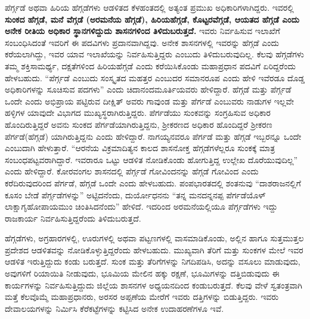 ಪೆರ್ಗ್ಗಡೆ ಅಥವಾ ಹಿರಿಯ ಹೆಗ್ಗಡೆಗಳು ಆಡಳಿತದ ಕೆಳಹಂತದಲ್ಲಿ ಅತ್ಯಂತ ಪ್ರಮುಖ ಅಧಿಕಾರಿಗಳಾಗಿದ್ದರು. ಇವರಲ್ಲಿ \textbf{ಸುಂಕದ ಹೆಗ್ಗಡೆ, ಮನೆ ವೆಗ್ಗಡೆ (ಅರಮನೆಯ ಹೆಗ್ಗಡೆ), ಹಿರಿಯಹೆಗ್ಗಡೆ, ಕೊಟ್ಟರವೆಗ್ಗಡೆ, ಆಯತದ ಹೆಗ್ಗಡೆ ಎಂದು ಅನೇಕ ರೀತಿಯ ಅಧಿಕಾರ ಸ್ಥಾನಗಳಿದ್ದುದು ಶಾಸನಗಳಿಂದ ತಿಳಿದುಬರುತ್ತದೆ. } ಇವರು ನಿರ್ವಹಿಸುವ ಇಲಾಖೆಗೆ ಸಂಬಂಧಿಸಿದಂತೆ ಇವರಿಗೆ ಈ ಪದವಿಗಳು ಪ್ರದಾನವಾಗಿದ್ದವು. ಅನೇಕ ಶಾಸನಗಳಲ್ಲಿ ಇವರನ್ನು ಹೆಗ್ಗಡೆ ಎಂದು ಕರೆಯಲಾಗಿದ್ದು, ಇವರ ಯಾವ ಇಲಾಖೆಯನ್ನು ನಿರ್ವಹಿಸುತ್ತಿದ್ದರು ಎಂಬುದು ತಿಳಿದುಬರುವುದಿಲ್ಲ. ಕೆಲವು ಹೆಗ್ಗಡೆಗಳು ತಮ್ಮ ಶಕ್ತಿಸಾಮರ್ಥ್ಯ, ದಕ್ಷತೆಗಳಿಂದ ಹಿರಿಯಹೆಗ್ಗಡೆ ಎಂದು ಕರೆಯಿಸಿಕೊಂಡು ಮಹಾಪ್ರಧಾನ ಪದವಿಗೆ ಏರಿದ್ದರೆಂದು ಹೇಳಬಹುದು. “ಪೆರ್ಗ್ಗಡೆ ಎಂಬುದು ಸಂಸ್ಕೃತದ ಮಹತ್ತರ ಎಂಬುದರ ಸಮಾನರೂಪ ಎಂದು ಹೇಳಿ ಇವೆರಡೂ ದೊಡ್ಡ ಅಧಿಕಾರಿಗಳನ್ನು ಸೂಚಿಸುವ ಪದಗಳು” ಎಂದು ಚಿದಾನಂದಮೂರ್ತಿಯವರು ಹೇಳಿದ್ದಾರೆ. ಹೆಗ್ಗಡೆ ಮತ್ತು ಪೆರ್ಗ್ಗಡೆ ಒಂದೇ ಎಂದು ಅಭಿಪ್ರಾಯ ಪಟ್ಟಿರುವ ದೀಕ್ಷಿತ್​ ಅವರು ಗಾವುಂಡ ಮತ್ತು ಪೆರ್ಗಡೆ ಎಂಬುವರು ನಾಡುಗಳ ಇಲ್ಲವೇ ಹಳ್ಳಿಗಳ ಯಾವುದೇ ವಿಭಾಗದ ಮುಖ್ಯಸ್ಥರಾಗಿರುತ್ತಿದ್ದರು. ಪೆರ್ಗಡೆಯು ಸುಂಕವನ್ನು ಸಂಗ್ರಹಿಸುವ ಅಧಿಕಾರ ಹೊಂದಿರುತ್ತಿದ್ದರೆ ಅವನು ಸುಂಕದ ಪೆರ್ಗಡೆಯಾಗಿರುತ್ತಿದ್ದನು, ಶ‍್ರೀಕರಣದ ಅಧಿಕಾರ ಹೊಂದಿದ್ದರೆ ಶ‍್ರೀಕರಣ ಪೆರ್ಗಡೆ(ಹೆಗ್ಗಡೆ) ಯಾಗಿರುತ್ತಿದ್ದನು ಎಂದು ಹೇಳಿದ್ದಾರೆ. ನಾಗಯ್ಯನವರೂ ಪೆರ್ಗಡೆ ಮತ್ತು ಹೆಗ್ಗಡೆ ಇಬ್ಬರನ್ನೂ ಒಂದೇ ಎಂಬುದಾಗಿ ಹೇಳುತ್ತಾರೆ. “ಆರನೆಯ ವಿಕ್ರಮಾದಿತ್ಯನ ಕಾಲದ ಶಾಸನೋಕ್ತ ಹೆಗ್ಗಡೆಗಳೆಲ್ಲರೂ ಸುಂಕಕ್ಕೆ ಮಾತ್ರ ಸಂಬಂಧಪಟ್ಟವರಾಗಿದ್ದಾರೆ. ಇವರಾರೂ ಒಟ್ಟು ಆಡಳಿತ ನೋಡಿಕೊಂಡು ಹೋಗುತ್ತಿದ್ದ ಉಲ್ಲೇಖ ದೊರೆಯುವುದಿಲ್ಲ” ಎಂದು ಹೇಳಿದ್ದಾರೆ. ಕೋರವಂಗಲ ಶಾಸನದಲ್ಲಿ ಪೆರ್ಗ್ಗಡೆ ಗೋವಿಂದನನ್ನು ಹೆಗ್ಗಡೆ ಗೋವಿಂದ ಎಂದು ಕರೆದಿರುವುದರಿಂದ ಪೆರ್ಗಡೆ, ಹೆಗ್ಗಡೆ ಒಂದೇ ಎಂದು ಹೇಳಬಹುದು. ಪಂಪಭಾರತದಲ್ಲಿ ಶಂತನುವು “ದಾಶರಾಜನಲ್ಲಿಗೆ ಕೂಸಂ ಬೇಡೆ ಪೆರ್ಗ್ಗಡೆಗಳನ್ನು” ಅಟ್ಟಿದನೆಂದು, ದುರ್ಯೋಧನನು “ತನ್ನ ಮನದನ್ನನಪ್ಪ ಪೆರ್ಗಡೆಯೊಳ್​ ಲಾಕ್ಷಾಗೃಹೋಪಾಯಮುಂ ಚಿಂತಿಸಿದನೆಂದು” ಹೇಳಿದೆ. ಇದರಿಂದ ಅರಮನೆಯಲ್ಲಿಯೂ ಪೆರ್ಗ್ಗಡೆಗಳು ಇದ್ದು ರಾಜಕಾರ್ಯ ನಿರ್ವಹಿಸುತ್ತಿದ್ದರೆಂದು ತಿಳಿದುಬರುತ್ತದೆ.

ಹೆಗ್ಗಡೆಗಳು, ಅಗ್ರಹಾರಗಳಲ್ಲಿ, ಊರುಗಳಲ್ಲಿ ಅಥವಾ ಪಟ್ಟಣಗಳಲ್ಲಿ ವಾಸಮಾಡಿಕೊಂಡು, ಅಲ್ಲಿನ ಹಾಗೂ ಸುತ್ತಮುತ್ತಲ ಪ್ರದೇಶದ ಆಡಳಿತವನ್ನು ನೋಡಿಕೊಳ್ಳುತ್ತಿದ್ದರೆಂದು ಹೇಳಬಹುದು. ಮುಖ್ಯವಾಗಿ ತೆರಿಗೆ ಮತ್ತು ಸುಂಕಗಳ ಮೇಲೆ ಇವರ ಆಡಳಿತ ಇರುತ್ತಿದ್ದುದು ಕಂಡು ಬರುತ್ತದೆ. ಸುಂಕ ಮತ್ತು ತೆರಿಗೆಗಳನ್ನು ನಿಗದಿಪಡಿಸಿ, ಅದನ್ನು ವಸೂಲು ಮಾಡುವುದು, ಅವುಗಳಿಗೆ ರಿಯಾಯಿತಿ ನೀಡುವುದು, ಭೂಮಿಯ ಮೇಲಿನ ಹಕ್ಕು ರಕ್ಷಣೆ, ಭೂಮಿಗಳನ್ನು ದತ್ತಿಬಿಡುವುದು ಈ ಕಾರ್ಯಗಳನ್ನು ನಿರ್ವಹಿಸುತ್ತಿದ್ದುದು ಜಿಲ್ಲೆಯ ಶಾಸನಗಳ ಅಧ್ಯಯನದಿಂದ ಕಂಡುಬರುತ್ತದೆ. ಕೆಲವು ವೇಳೆ ಸ್ವತಂತ್ರವಾಗಿ ಮತ್ತೆ ಕೆಲವೊಮ್ಮೆ ಮಹಾಪ್ರಧಾನರು, ಅರಸರ ಅಪ್ಪಣೆಯ ಮೇರೆಗೆ ಇವರು ದತ್ತಿಗಳನ್ನು ಬಿಡುತ್ತಿದ್ದರು. ಇವರು ದೇವಾಲಯಗಳನ್ನು ನಿರ್ಮಿಸಿ ಕೆರೆಕಟ್ಟೆಗಳನ್ನು ಕಟ್ಟಿಸಿದ ಅನೇಕ ಉದಾಹರಣೆಗಳೂ ಇವೆ.

